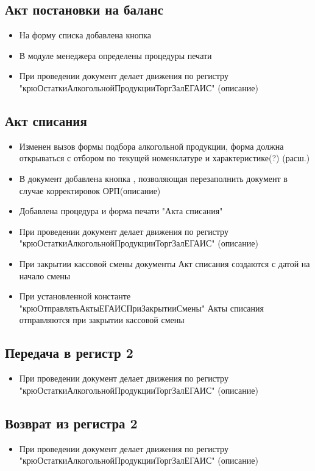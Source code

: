 \subsection{Акт постановки на баланс}
\begin{itemize}
	\item На форму списка добавлена кнопка  
	\item В модуле менеджера определены процедуры печати
	\item При проведении документ делает движения по регистру "крюОстаткиАлкогольнойПродукцииТоргЗалЕГАИС"
	(описание)
\end{itemize}




\subsection{Акт списания}
\begin{itemize}
	\item Изменен вызов формы подбора алкогольной продукции, форма должна открываться с отбором по текущей номенклатуре и характеристике(?)
	(расш.)
	\item В документ добавлена кнопка  , позволяющая перезаполнить документ в случае корректировок ОРП(описание)
	\item Добавлена процедура и форма печати "Акта списания"
	\item При проведении документ делает движения по регистру "крюОстаткиАлкогольнойПродукцииТоргЗалЕГАИС"
	(описание)
	\item При закрытии кассовой смены документы Акт списания создаются с датой на начало смены
	\item При установленной константе "крюОтправлятьАктыЕГАИСПриЗакрытииСмены" Акты списания отправляются при закрытии кассовой смены
\end{itemize}

\subsection{Передача в регистр 2}
\begin{itemize}
	\item При проведении документ делает движения по регистру "крюОстаткиАлкогольнойПродукцииТоргЗалЕГАИС"
	(описание)
\end{itemize}

\subsection{Возврат из регистра 2}
\begin{itemize}
	\item При проведении документ делает движения по регистру "крюОстаткиАлкогольнойПродукцииТоргЗалЕГАИС"
	(описание)
\end{itemize}

